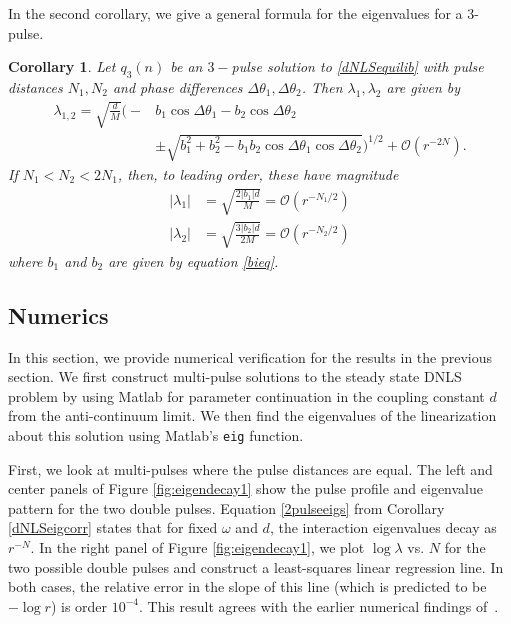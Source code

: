 \documentclass[12pt]{article}
\newtheorem{corollary}{Corollary}
\begin{document}
In the second corollary, we give a general formula for the eigenvalues for a 3-pulse.

\begin{corollary}\label{dNLSeigcorr2}
Let $q_3(n)$ be an $3-$pulse solution to \eqref{dNLSequilib} with pulse distances $N_1, N_2$ and phase differences $\Delta \theta_1, \Delta \theta_2$. Then $\lambda_1, \lambda_2$ are given by
\begin{equation}\label{3pulseeigs}
\begin{aligned}
\lambda_{1,2} = \sqrt{\frac{d}{M}}
\Big( -&b_1\cos\Delta\theta_1 - b_2\cos\Delta\theta_2  \\
&\pm \sqrt{b_1^2 + b_2^2 - b_1 b_2\cos\Delta\theta_1 \cos\Delta\theta_2} \Big)^{1/2} + \mathcal{O}(r^{-2N}).
\end{aligned}
\end{equation}
If $N_1 < N_2 < 2 N_1$, then, to leading order, these have magnitude
\begin{equation}\label{3pulsemag}
\begin{aligned}
|\lambda_1| &= \sqrt{\frac{2 |b_1| d}{M}} = \mathcal{O}(r^{-N_1/2}) \\
|\lambda_2| &= \sqrt{\frac{3 |b_2| d}{2 M}} = \mathcal{O}(r^{-N_2/2})
\end{aligned}
\end{equation}
where $b_1$ and $b_2$ are given by equation \eqref{bieq}.
\end{corollary}

\subsection{Numerics}

In this section, we provide numerical verification for the results in the previous section. We first construct multi-pulse solutions to the steady state DNLS problem by using Matlab for parameter continuation in the coupling constant $d$ from the anti-continuum limit. We then find the eigenvalues of the linearization about this solution using Matlab's \texttt{eig} function. 

First, we look at multi-pulses where the pulse distances are equal.  The left and center panels of Figure \ref{fig:eigendecay1} show the pulse profile and eigenvalue pattern for the two double pulses. Equation \eqref{2pulseeigs} from Corollary \ref{dNLSeigcorr} states that for fixed $\omega$ and $d$, the interaction eigenvalues decay as $r^{-N}$. In the right panel of Figure \ref{fig:eigendecay1}, we plot $\log \lambda$ vs. $N$ for the two possible double pulses and construct a least-squares linear regression line. In both cases, the relative error in the slope of this line (which is predicted to be $-\log r$) is order $10^{-4}$. This result agrees with the earlier numerical findings of~\cite{Kapitula2001a}.
\end{document}
